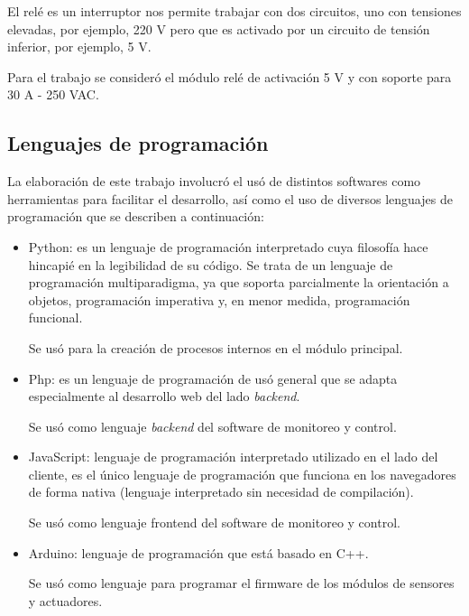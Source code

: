 El relé es un interruptor nos permite trabajar con dos circuitos, uno con tensiones elevadas, por ejemplo, 220 V pero que es activado por un circuito de tensión inferior, por ejemplo, 5 V.

Para el trabajo se consideró el módulo relé de activación 5 V y con soporte para 30 A - 250 VAC.

\subsection{Lenguajes de programación}

La elaboración de este trabajo involucró el usó de distintos softwares como herramientas para facilitar el desarrollo, así como el uso de diversos lenguajes de programación que se describen a continuación:
\begin{itemize}
\item Python: es un lenguaje de programación interpretado cuya filosofía hace hincapié en la legibilidad de su código. Se trata de un lenguaje de programación multiparadigma, ya que soporta parcialmente la orientación a objetos, programación imperativa y, en menor medida, programación funcional.

Se usó para la creación de procesos internos en el módulo principal. 
\item Php: es un lenguaje de programación de usó general que se adapta especialmente al desarrollo web del lado \emph{backend}.

Se usó como lenguaje \emph{backend} del software de monitoreo y control.
\item JavaScript: lenguaje de programación interpretado utilizado en el lado del cliente, es el único lenguaje de programación que funciona en los navegadores de forma nativa (lenguaje interpretado sin necesidad de compilación).

Se usó como lenguaje frontend del software de monitoreo y control.
\item Arduino: lenguaje de programación que está basado en C++.

Se usó como lenguaje para programar el firmware de los módulos de sensores y actuadores.
\end{itemize}